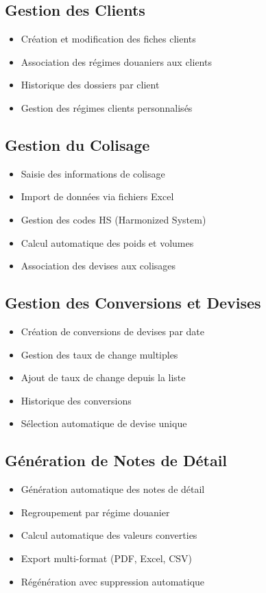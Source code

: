 \documentclass[12pt,a4paper]{report}
\begin{document}
\subsection{Gestion des Clients}
\begin{itemize}[leftmargin=*]
    \item Création et modification des fiches clients
    \item Association des régimes douaniers aux clients
    \item Historique des dossiers par client
    \item Gestion des régimes clients personnalisés
\end{itemize}

\subsection{Gestion du Colisage}
\begin{itemize}[leftmargin=*]
    \item Saisie des informations de colisage
    \item Import de données via fichiers Excel
    \item Gestion des codes HS (Harmonized System)
    \item Calcul automatique des poids et volumes
    \item Association des devises aux colisages
\end{itemize}

\subsection{Gestion des Conversions et Devises}
\begin{itemize}[leftmargin=*]
    \item Création de conversions de devises par date
    \item Gestion des taux de change multiples
    \item Ajout de taux de change depuis la liste
    \item Historique des conversions
    \item Sélection automatique de devise unique
\end{itemize}

\subsection{Génération de Notes de Détail}
\begin{itemize}[leftmargin=*]
    \item Génération automatique des notes de détail
    \item Regroupement par régime douanier
    \item Calcul automatique des valeurs converties
    \item Export multi-format (PDF, Excel, CSV)
    \item Régénération avec suppression automatique
\end{itemize}
\end{document}
